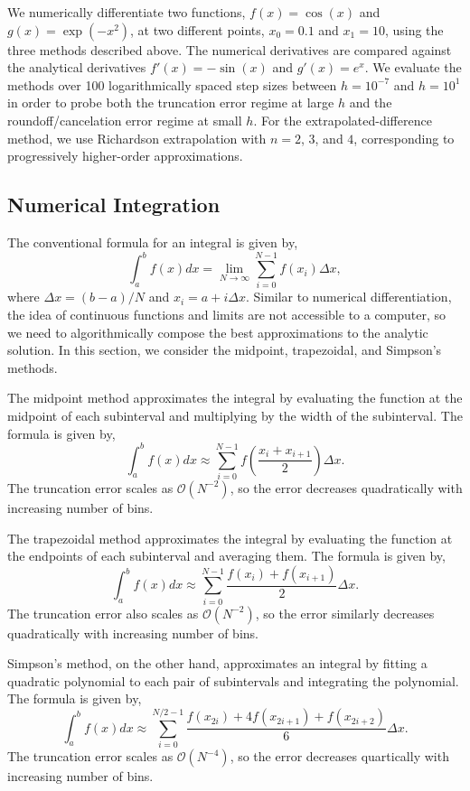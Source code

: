 \documentclass[a4paper,11pt]{article}
\begin{document}
We numerically differentiate two functions, $f(x) = \cos(x)$ and $g(x) = \exp(-x^2)$, at two different points, $x_0 = 0.1$ and $x_1 = 10$, using the three methods described above. The numerical derivatives are compared against the analytical derivatives $f'(x)=-\sin(x)$ and $g'(x)=e^x$. We evaluate the methods over 100 logarithmically spaced step sizes between $h=10^{-7}$ and $h=10^{1}$ in order to probe both the truncation error regime at large $h$ and the roundoff/cancelation error regime at small $h$. For the extrapolated-difference method, we use Richardson extrapolation with $n=2$, $3$, and $4$, corresponding to progressively higher-order approximations.

\subsection*{Numerical Integration}

The conventional formula for an integral is given by, \[ \int_a^b f(x) dx = \lim_{N \to \infty} \sum_{i=0}^{N-1} f(x_i) \Delta x, \] where $\Delta x = (b-a)/N$ and $x_i = a + i\Delta x$. Similar to numerical differentiation, the idea of continuous functions and limits are not accessible to a computer, so we need to algorithmically compose the best approximations to the analytic solution. In this section, we consider the midpoint, trapezoidal, and Simpson's methods. 

The midpoint method approximates the integral by evaluating the function at the midpoint of each subinterval and multiplying by the width of the subinterval. The formula is given by, \[ \int_a^b f(x) dx \approx \sum_{i=0}^{N-1} f\left(\frac{x_i + x_{i+1}}{2}\right) \Delta x. \] The truncation error scales as $\mathcal{O}(N^{-2})$, so the error decreases quadratically with increasing number of bins.

The trapezoidal method approximates the integral by evaluating the function at the endpoints of each subinterval and averaging them. The formula is given by, \[ \int_a^b f(x) dx \approx \sum_{i=0}^{N-1} \frac{f(x_i) + f(x_{i+1})}{2} \Delta x. \] The truncation error also scales as $\mathcal{O}(N^{-2})$, so the error similarly decreases quadratically with increasing number of bins.

Simpson's method, on the other hand, approximates an integral by fitting a quadratic polynomial to each pair of subintervals and integrating the polynomial. The formula is given by, \[ \int_a^b f(x) dx \approx \sum_{i=0}^{N/2-1} \frac{f(x_{2i}) + 4f(x_{2i+1}) + f(x_{2i+2})}{6} \Delta x. \] The truncation error scales as $\mathcal{O}(N^{-4})$, so the error decreases quartically with increasing number of bins.
\end{document}
